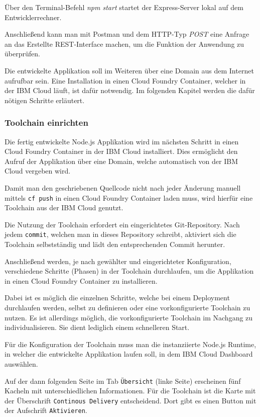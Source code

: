 Über den Terminal-Befehl \textit{npm start} startet der Express-Server lokal auf dem Entwicklerrechner.

Anschließend kann man mit Postman und dem HTTP-Typ \textit{POST} eine Anfrage an das Erstellte REST-Interface machen, um
die Funktion der Anwendung zu überprüfen.

Die entwickelte Applikation soll im Weiteren über eine Domain aus dem Internet aufrufbar sein. Eine Installation in
einen Cloud Foundry Container, welcher in der IBM Cloud läuft, ist dafür notwendig. Im folgenden Kapitel werden die
dafür nötigen Schritte erläutert.

\subsubsection{Toolchain einrichten}
\label{sub:tollchain_einrichten}
Die fertig entwickelte Node.js Applikation wird im nächsten Schritt in einen Cloud Foundry Container in der IBM Cloud
installiert. Dies ermöglicht den Aufruf der Applikation über eine Domain, welche automatisch von der IBM Cloud vergeben
wird.

Damit man den geschriebenen Quellcode nicht nach jeder Änderung manuell mittels \texttt{cf push} in einen Cloud Foundry
Container laden muss, wird hierfür eine Toolchain aus der IBM Cloud genutzt.

Die Nutzung der Toolchain erfordert ein eingerichtetes Git-Repository. Nach jedem \texttt{commit}, welchen man in dieses
Repository schreibt, aktiviert sich die Toolchain selbstständig und lädt den entsprechenden Commit herunter.

Anschließend werden, je nach gewählter und eingerichteter Konfiguration, verschiedene Schritte (Phasen) in der Toolchain
durchlaufen, um die Applikation in einen Cloud Foundry Container zu installieren.

Dabei ist es möglich die einzelnen Schritte, welche bei einem Deployment durchlaufen werden, selbst zu definieren oder
eine vorkonfigurierte Toolchain zu nutzen. Es ist allerdings möglich, die vorkonfigurierte Toolchain im Nachgang zu
individualisieren. Sie dient lediglich einem schnelleren Start.

Für die Konfiguration der Toolchain muss man die instanziierte Node.js Runtime, in welcher die entwickelte Applikation
laufen soll, in dem IBM Cloud Dashboard auswählen.

Auf der dann folgenden Seite im Tab \texttt{Übersicht} (linke Seite) erscheinen fünf Kacheln mit unterschiedlichen
Informationen. Für die Toolchain ist die Karte mit der Überschrift \texttt{Continous Delivery} entscheidend. Dort gibt
es einen Button mit der Aufschrift \texttt{Aktivieren}.

